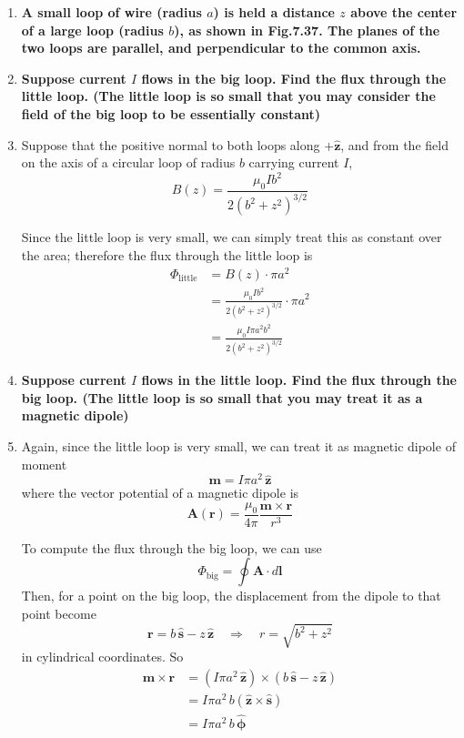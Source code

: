 \documentclass[12pt]{article}
\begin{document}
\newpage%

\begin{enumerate}
  \item[P7.23] \textbf{A small loop of wire (radius $a$) is held a distance $z$ above the center of a large loop (radius $b$), as shown in Fig.7.37. The planes of the two loops are parallel, and perpendicular to the common axis.}
 
\item[(a)] \textbf{Suppose current $I$ flows in the big loop. Find the flux through the little loop. (The little loop is so small that you may consider the field of the big loop to be essentially constant)}

\item[Solution]
Suppose that the positive normal to both loops along $+\hat{\mathbf z}$, and from the field on the axis of a circular loop of radius $b$ carrying current $I$,
\[
B(z)=\frac{\mu_0 I b^2}{2\left(b^2+z^2\right)^{3/2}}
\]

Since the little loop is very small, we can simply treat this as constant over the area; therefore the flux through the little loop is
\[
\begin{aligned}
\Phi_{\text{little}}
&=B(z)\cdot \pi a^2\\[4pt]
&=\frac{\mu_0 I b^2}{2\left(b^2+z^2\right)^{3/2}}\cdot \pi a^2\\[4pt]
&=\frac{\mu_0 I\pi a^2 b^2}{2\left(b^2+z^2\right)^{3/2}}
\end{aligned}
\]

\item[(b)] \textbf{Suppose current $I$ flows in the little loop. Find the flux through the big loop. (The little loop is so small that you may treat it as a magnetic dipole)}

\item[Solution]
Again, since the little loop is very small, we can treat it as magnetic dipole of moment
\[
\mathbf m=I\pi a^2\,\hat{\mathbf z}
\]
where the vector potential of a magnetic dipole is
\[
\mathbf A(\mathbf r)=\frac{\mu_0}{4\pi}\frac{\mathbf m\times \mathbf r}{r^3}
\]

To compute the flux through the big loop, we can use
\[
\Phi_{\text{big}}=\oint \mathbf A\cdot d\mathbf l
\]
Then, for a point on the big loop, the displacement from the dipole to that point become
\[
\mathbf r=b\,\hat{\mathbf s}-z\,\hat{\mathbf z}\quad \Longrightarrow\quad r=\sqrt{b^2+z^2}
\]
in cylindrical coordinates. So
\[
\begin{aligned}
\mathbf m\times \mathbf r
&=\left(I\pi a^2\,\hat{\mathbf z}\right)\times\left(b\,\hat{\mathbf s}-z\,\hat{\mathbf z}\right)\\[4pt]
&=I\pi a^2\,b\left(\hat{\mathbf z}\times \hat{\mathbf s}\right)\\[4pt]
&=I\pi a^2\,b\,\hat{\boldsymbol\phi}
\end{aligned}
\]


\end{enumerate}
\end{document}
